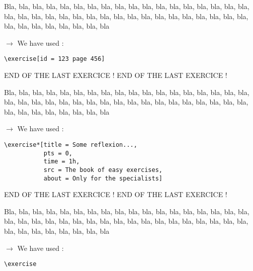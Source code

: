 \documentclass[12pt]{article}
\newcommand\blabla{%
		\noindent%
		Bla, bla, bla, bla, bla, bla, bla, bla, bla, bla, bla,
		bla, bla, bla, bla, bla, bla, bla, bla, bla, bla, bla,
		bla, bla, bla, bla, bla, bla, bla, bla, bla, bla, bla,
		bla, bla, bla, bla, bla, bla, bla, bla, bla, bla, bla
	}
\newcommand\codeused{%
		\blabla{} \medskip  \par
		\noindent $\rightarrow$ We have used :
	}
\begin{document}
\exercise[id = 123 page 456]

\codeused{}
\begin{verbatim}
\exercise[id = 123 page 456]
\end{verbatim}



\newpage \medskip \noindent END OF THE LAST EXERCICE ! END OF THE LAST EXERCICE !

\exercise*[title = Some reflexion..., pts = 0, time = 1h, src = The book of easy exercises, about = Only for the specialists]

\codeused{}
\begin{verbatim}
\exercise*[title = Some reflexion..., 
           pts = 0, 
           time = 1h,
           src = The book of easy exercises,
           about = Only for the specialists]
\end{verbatim}

\newpage \medskip \noindent END OF THE LAST EXERCICE ! END OF THE LAST EXERCICE !

\exercise

\codeused{}
\begin{verbatim}
\exercise
\end{verbatim}
\end{document}
